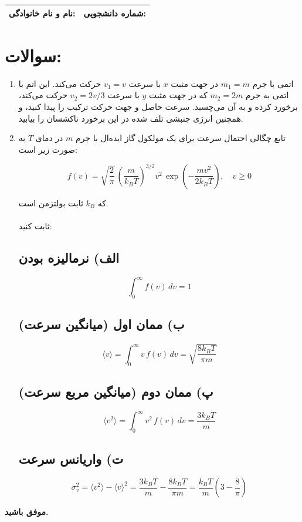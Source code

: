 \documentclass[12pt,a4paper]{article}
\begin{document}
	
	\begin{tabular}{|p{7cm}|p{7cm}|}
		\hline
		\textbf{نام و نام خانوادگی:} & \textbf{شماره دانشجویی:} \\
		\hline
	\end{tabular}
	
	
	\section*{سوالات:}
	\begin{enumerate}
		\item 
		
		اتمی با جرم $m_1 = m$ در جهت مثبت $x$ با سرعت $v_1 = v$ حرکت می‌کند. این اتم با اتمی به جرم $m_2 = 2m$ که در جهت مثبت $y$ با سرعت $v_2 = 2v/3$ حرکت می‌کند، برخورد کرده و به آن می‌چسبد. سرعت حاصل و جهت حرکت ترکیب را پیدا کنید، و همچنین انرژی جنبشی تلف شده در این برخورد ناکشسان را بیابید.
		\item 
		
		تابع چگالی احتمال سرعت برای یک مولکول گاز ایده‌ال با جرم $m$ در دمای $T$ به صورت زیر است:
		
		\[
		f(v) = \sqrt{\frac{2}{\pi}} \, \left( \frac{m}{k_B T} \right)^{3/2} v^{2} \, \exp\left( -\frac{m v^{2}}{2 k_B T} \right), \quad v \ge 0
		\]
		
		که $k_B$ ثابت بولتزمن است.
		\\
		\\
		
		ثابت کنید:
		
		\subsection*{الف) نرمالیزه بودن}
		\[
		\int_{0}^{\infty} f(v) \, dv = 1
		\]
		
		\subsection*{ب) ممان اول (میانگین سرعت)}
		\[
		\langle v \rangle = \int_{0}^{\infty} v \, f(v) \, dv = \sqrt{\frac{8 k_B T}{\pi m}}
		\]
		
		\subsection*{پ) ممان دوم (میانگین مربع سرعت)}
		\[
		\langle v^{2} \rangle = \int_{0}^{\infty} v^{2} \, f(v) \, dv = \frac{3 k_B T}{m}
		\]
		
		\subsection*{ت) واریانس سرعت}
		\[
		\sigma_v^{2} = \langle v^{2} \rangle - \langle v \rangle^{2}
		= \frac{3 k_B T}{m} - \frac{8 k_B T}{\pi m}
		= \frac{k_B T}{m} \left( 3 - \frac{8}{\pi} \right)
		\]
		
	
		
	\end{enumerate}
	
	\vspace{10pt}
	\textbf{موفق باشید.}
	
\end{document}
